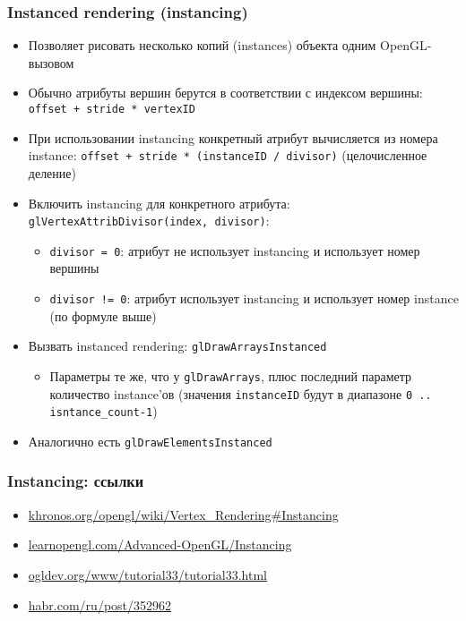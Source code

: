 \documentclass{beamer}
\begin{document}
\begin{frame}[fragile]
\fontsize{10pt}{10pt}
\frametitle{Instanced rendering (instancing)}
\begin{itemize}
\item Позволяет рисовать несколько копий (instances) объекта одним OpenGL-вызовом
\pause
\item Обычно атрибуты вершин берутся в соответствии с индексом вершины: \verb|offset + stride * vertexID|
\pause
\item При использовании instancing конкретный атрибут вычисляется из номера instance: \verb|offset + stride * (instanceID / divisor)| (целочисленное деление)
\pause
\item Включить instancing для конкретного атрибута: \verb|glVertexAttribDivisor(index, divisor)|:
\begin{itemize}
\item \verb|divisor = 0|: атрибут не использует instancing и использует номер вершины
\item \verb|divisor != 0|: атрибут использует instancing и использует номер instance (по формуле выше)
\end{itemize}
\pause
\item Вызвать instanced rendering: \verb|glDrawArraysInstanced|
\begin{itemize}
\item Параметры \textendash{} те же, что у \verb|glDrawArrays|, плюс последний параметр \textendash{} количество instance'ов (значения \verb|instanceID| будут в диапазоне \verb|0 .. isntance_count-1|)
\end{itemize}
\pause
\item Аналогично есть \verb|glDrawElementsInstanced|
\end{itemize}
\end{frame}

\begin{frame}[fragile]
\frametitle{Instancing: ссылки}
\begin{itemize}
\item \href{https://www.khronos.org/opengl/wiki/Vertex_Rendering#Instancing}{khronos.org/opengl/wiki/Vertex\_Rendering\#Instancing}
\item \href{https://learnopengl.com/Advanced-OpenGL/Instancing}{learnopengl.com/Advanced-OpenGL/Instancing}
\item \href{https://ogldev.org/www/tutorial33/tutorial33.html}{ogldev.org/www/tutorial33/tutorial33.html}
\item \href{https://habr.com/ru/post/352962}{habr.com/ru/post/352962}
\end{itemize}
\end{frame}
\end{document}
